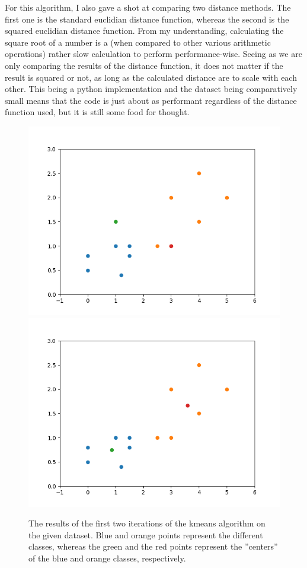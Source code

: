 \documentclass[a4paper, titlepage,12pt]{article}
\begin{document}
For this algorithm, I also gave a shot at comparing two distance methods. The first one is the standard euclidian distance function, whereas the second is the squared euclidian distance function. From my understanding, calculating the square root of a number is a (when compared to other various arithmetic operations) rather slow calculation to perform performance-wise. Seeing as we are only comparing the results of the distance function, it does not matter if the result is squared or not, as long as the calculated distance are to scale with each other. This being a python implementation and the dataset being comparatively small means that the code is just about as performant regardless of the distance function used, but it is still some food for thought. 

\begin{figure}[H]
	\begin{center}
		\includegraphics[scale=0.5]{./kmeans_iter_1.png}
		\includegraphics[scale=0.5]{./kmeans_iter_2.png}
		\caption{The results of the first two iterations of the kmeans algorithm on the given dataset. Blue and orange points represent the different classes, whereas the green and the red points represent the ''centers'' of the blue and orange classes, respectively.}
	\end{center}
\end{figure}
\end{document}
